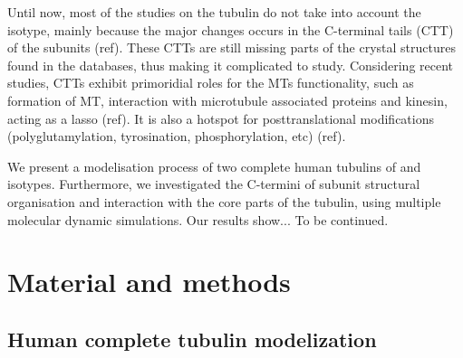 \documentclass[a4paper]{article}
\begin{document}
Until now, most of the studies on the tubulin do not take into account the isotype, mainly
because the major changes occurs in the C-terminal tails (CTT) of the subunits (ref). These CTTs
are still missing parts of the crystal structures found in the databases, thus making it
complicated to study. Considering recent studies, CTTs exhibit primoridial roles for the
MTs functionality, such as formation of MT, interaction with microtubule associated proteins and
kinesin, acting as a lasso (ref). It is also a hotspot for posttranslational modifications
(polyglutamylation, tyrosination, phosphorylation, etc) (ref).

We present a modelisation process of two complete human tubulins of  and
 isotypes. Furthermore, we investigated the C-termini of \beta subunit
structural organisation and interaction with the core parts of the tubulin, using
multiple molecular dynamic simulations. Our results show... To be continued.

\section{Material and methods}

\subsection{Human complete tubulin modelization}

\end{document}
